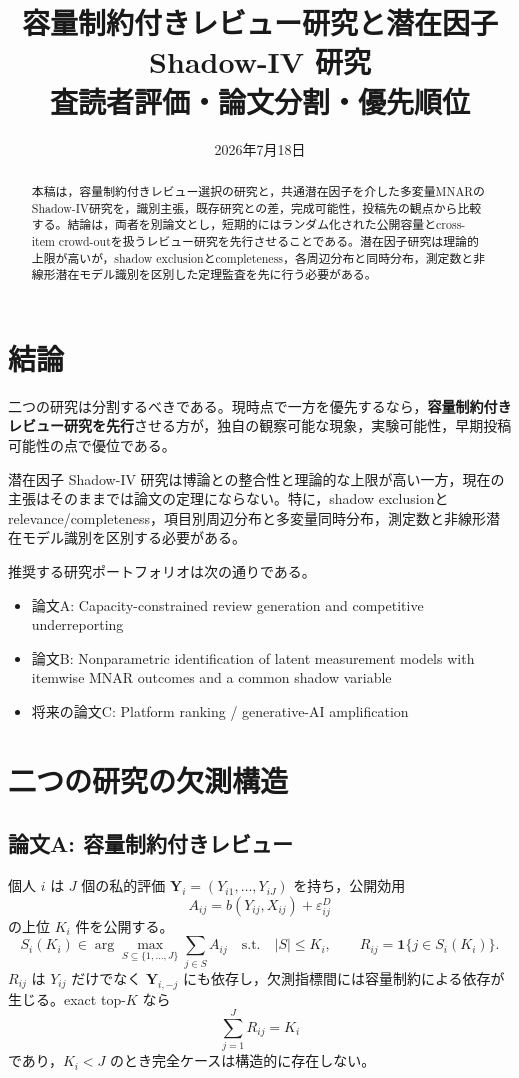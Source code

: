 \documentclass[a4paper,11pt,xelatex,ja=standard]{bxjsarticle}
\title{容量制約付きレビュー研究と潜在因子 Shadow-IV 研究\\
\large 査読者評価・論文分割・優先順位}
\author{}
\date{2026年7月18日}
\newcommand{\Y}{\bm Y}
\begin{document}
\maketitle

\begin{abstract}
本稿は，容量制約付きレビュー選択の研究と，共通潜在因子を介した多変量MNARのShadow-IV研究を，識別主張，既存研究との差，完成可能性，投稿先の観点から比較する。結論は，両者を別論文とし，短期的にはランダム化された公開容量とcross-item crowd-outを扱うレビュー研究を先行させることである。潜在因子研究は理論的上限が高いが，shadow exclusionとcompleteness，各周辺分布と同時分布，測定数と非線形潜在モデル識別を区別した定理監査を先に行う必要がある。
\end{abstract}

\section{結論}

二つの研究は分割するべきである。現時点で一方を優先するなら，\textbf{容量制約付きレビュー研究を先行}させる方が，独自の観察可能な現象，実験可能性，早期投稿可能性の点で優位である。

潜在因子 Shadow-IV 研究は博論との整合性と理論的な上限が高い一方，現在の主張はそのままでは論文の定理にならない。特に，shadow exclusionとrelevance/completeness，項目別周辺分布と多変量同時分布，測定数と非線形潜在モデル識別を区別する必要がある。

推奨する研究ポートフォリオは次の通りである。
\begin{itemize}
  \item 論文A: Capacity-constrained review generation and competitive underreporting
  \item 論文B: Nonparametric identification of latent measurement models with itemwise MNAR outcomes and a common shadow variable
  \item 将来の論文C: Platform ranking / generative-AI amplification
\end{itemize}

\section{二つの研究の欠測構造}

\subsection{論文A: 容量制約付きレビュー}

個人 $i$ は $J$ 個の私的評価 $\Y_i=(Y_{i1},\ldots,Y_{iJ})$ を持ち，公開効用
\[
A_{ij}=b(Y_{ij},X_{ij})+\varepsilon^D_{ij}
\]
の上位 $K_i$ 件を公開する。
\[
S_i(K_i)\in
\arg\max_{S\subseteq\{1,\ldots,J\}}
\sum_{j\in S}A_{ij}
\quad\text{s.t.}\quad |S|\le K_i,
\qquad
R_{ij}=\mathbf 1\{j\in S_i(K_i)\}.
\]
$R_{ij}$ は $Y_{ij}$ だけでなく $\Y_{i,-j}$ にも依存し，欠測指標間には容量制約による依存が生じる。exact top-$K$ なら
\[
\sum_{j=1}^J R_{ij}=K_i
\]
であり，$K_i<J$ のとき完全ケースは構造的に存在しない。
\end{document}
